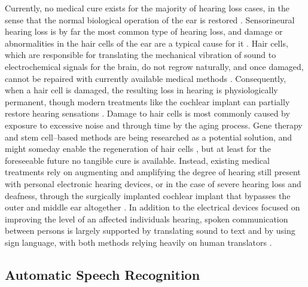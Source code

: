 \documentclass[english, 12pt, a4paper, pdftex, elec, utf8]{aaltothesis}
\begin{document}
Currently, no medical cure exists for the majority of hearing loss cases, in the sense that the normal biological operation of the ear is restored \cite{moore2007cochlear}. Sensorineural hearing loss is by far the most common type of hearing loss, and damage or abnormalities in the hair cells of the ear are a typical cause for it \cite{moore2007cochlear, koskela2013kuulokojeen}. Hair cells, which are responsible for translating the mechanical vibration of sound to electrochemical signals for the brain, do not regrow naturally, and once damaged, cannot be repaired with currently available medical methods \cite{moore2007cochlear}. Consequently, when a hair cell is damaged, the resulting loss in hearing is physiologically permanent, though modern treatments like the cochlear implant can partially restore hearing sensations \cite{moore2007cochlear}. Damage to hair cells is most commonly caused by exposure to excessive noise and through time by the aging process. Gene therapy and stem cell--based methods are being researched as a potential solution, and might someday enable the regeneration of hair cells  \cite{mclean2017clonal}, but at least for the foreseeable future no tangible cure is available. Instead, existing medical treatments rely on augmenting and amplifying the degree of hearing still present with personal electronic hearing devices, or in the case of severe hearing loss and deafness, through the surgically implanted cochlear implant that bypasses the outer and middle ear altogether \cite{moore2007cochlear}. In addition to the electrical devices focused on improving the level of an affected individuals hearing, spoken communication between persons is largely supported by translating sound to text and by using sign language, with both methods relying heavily on human translators \cite{moore2007cochlear, raino2012sisakorvaistutteen}.

\subsection{Automatic Speech Recognition}
\end{document}

